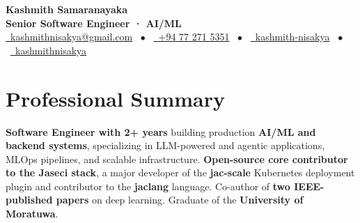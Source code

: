 \documentclass[letterpaper,11pt]{article}
\begin{document}
\begin{center}
\textbf{\Huge Kashmith Samaranayaka} \\[8pt]
{\Large \textbf{Senior Software Engineer · AI/ML}} \\[6pt]
\small
\href{mailto:kashmithnisakya@gmail.com}{\raisebox{-0.05\height}\faEnvelope\ kashmithnisakya@gmail.com} \ $\bullet$ \
\href{tel:+94 77 271 5351}{\raisebox{-0.05\height}\faMobile\ +94 77 271 5351} \ $\bullet$ \
\href{https://www.linkedin.com/in/kashmith-nisakya/}{\raisebox{-0.05\height}\faLinkedin\ kashmith-nisakya} \ $\bullet$ \
\href{https://github.com/kashmithnisakya}{\raisebox{-0.05\height}\faGithub\ kashmithnisakya}
\end{center}

\section{\Large Professional Summary}
\begin{justify}
\textbf{Software Engineer with 2+ years} building production \textbf{AI/ML and backend systems}, specializing in LLM-powered and agentic applications, MLOps pipelines, and scalable infrastructure. \textbf{Open-source core contributor to the Jaseci stack}, a major developer of the \textbf{jac-scale} Kubernetes deployment plugin and contributor to the \textbf{jaclang} language. Co-author of \textbf{two IEEE-published papers} on deep learning. Graduate of the \textbf{University of Moratuwa}.
\end{justify}





\newpage




\end{document}

